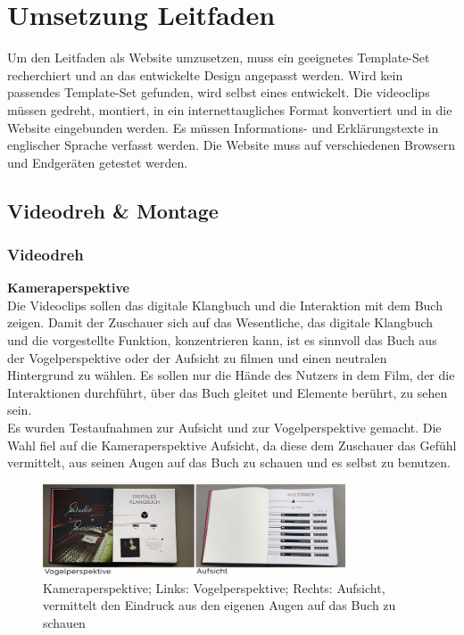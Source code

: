 






\chapter{Umsetzung Leitfaden}
Um den Leitfaden als Website umzusetzen, muss ein geeignetes Template-Set recherchiert und an das entwickelte Design angepasst werden. Wird kein passendes Template-Set gefunden, wird selbst eines entwickelt. Die \gls{videoclip}s müssen gedreht, montiert, in ein internettaugliches Format konvertiert und in die Website eingebunden werden. Es müssen Informations- und Erklärungstexte in englischer Sprache verfasst werden. Die Website muss auf verschiedenen Browsern und Endgeräten getestet werden.



\section{Videodreh \& Montage}

\subsection{Videodreh}

\textbf{Kameraperspektive}\\
Die Videoclips sollen das digitale Klangbuch und die Interaktion mit dem Buch zeigen. Damit der Zuschauer sich auf das Wesentliche, das digitale Klangbuch und die vorgestellte Funktion, konzentrieren kann, ist es sinnvoll das Buch aus der Vogelperspektive oder der Aufsicht zu filmen und einen neutralen Hintergrund zu wählen. Es sollen nur die Hände des Nutzers in dem Film, der die Interaktionen durchführt, über das Buch gleitet und Elemente berührt, zu sehen sein.\\

Es wurden Testaufnahmen zur Aufsicht und zur Vogelperspektive gemacht. Die Wahl fiel auf die Kameraperspektive Aufsicht, da diese dem Zuschauer das Gefühl vermittelt, aus seinen Augen auf das Buch zu schauen und es selbst zu benutzen.

\begin{figure}[H]
\centering
\includegraphics[width=0.8\textwidth]{grafiken/perspektive.jpg}
\caption{Kameraperspektive; Links: Vogelperspektive; Rechts: Aufsicht, vermittelt den Eindruck aus den eigenen Augen auf das Buch zu schauen}
\end{figure}



